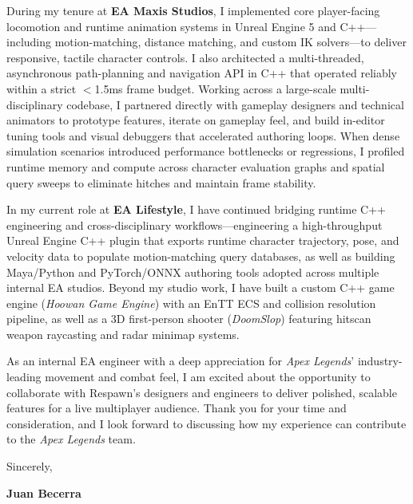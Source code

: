 \documentclass[letterpaper,11pt]{article}
\begin{document}
During my tenure at \textbf{EA Maxis Studios}, I implemented core player-facing locomotion and runtime animation systems in Unreal Engine 5 and C++---including motion-matching, distance matching, and custom IK solvers---to deliver responsive, tactile character controls. I also architected a multi-threaded, asynchronous path-planning and navigation API in C++ that operated reliably within a strict $<$1.5ms frame budget. Working across a large-scale multi-disciplinary codebase, I partnered directly with gameplay designers and technical animators to prototype features, iterate on gameplay feel, and build in-editor tuning tools and visual debuggers that accelerated authoring loops. When dense simulation scenarios introduced performance bottlenecks or regressions, I profiled runtime memory and compute across character evaluation graphs and spatial query sweeps to eliminate hitches and maintain frame stability.

In my current role at \textbf{EA Lifestyle}, I have continued bridging runtime C++ engineering and cross-disciplinary workflows---engineering a high-throughput Unreal Engine C++ plugin that exports runtime character trajectory, pose, and velocity data to populate motion-matching query databases, as well as building Maya/Python and PyTorch/ONNX authoring tools adopted across multiple internal EA studios. Beyond my studio work, I have built a custom C++ game engine (\emph{Hoowan Game Engine}) with an EnTT ECS and collision resolution pipeline, as well as a 3D first-person shooter (\emph{DoomSlop}) featuring hitscan weapon raycasting and radar minimap systems.

As an internal EA engineer with a deep appreciation for \emph{Apex Legends}' industry-leading movement and combat feel, I am excited about the opportunity to collaborate with Respawn's designers and engineers to deliver polished, scalable features for a live multiplayer audience. Thank you for your time and consideration, and I look forward to discussing how my experience can contribute to the \emph{Apex Legends} team.

\vspace{10pt}
\noindent Sincerely,

\vspace{14pt}
\noindent \textbf{Juan Becerra}
\end{document}
